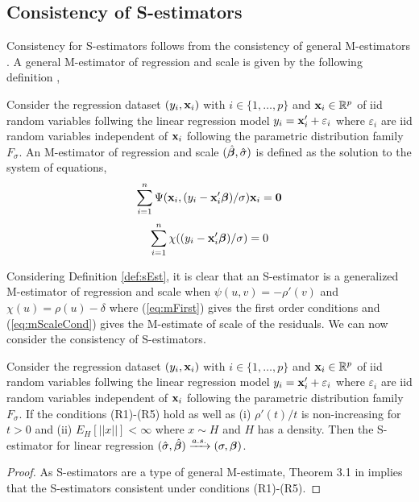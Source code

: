 \subsection{Consistency of S-estimators}

Consistency for S-estimators follows from the consistency of general M-estimators \cite{maronna2019robust}. A general M-estimator of regression and scale is given by the following definition \cite{maronna1981asymptotic},
\begin{defn}
Consider the regression dataset $(y_i, \mathbf{x}_i)$ with $i\in\{1,\hdots,p\}$ and $\mathbf{x}_i \in \mathbb{R}^p$ of iid random variables follwing the linear regression model $y_i = \mathbf{x}_i'+\varepsilon_i$ where $\varepsilon_i$ are iid random variables independent of $\mathbf{x}_i$ following the parametric distribution family $F_\sigma$. An M-estimator of regression and scale $(\hat{\bm{\beta}}, \hat\sigma)$ is defined as the solution to the system of equations,
\begin{equation}
\label{eq:mFirst}
    \sum_{i=1}^n \Psi(\mathbf{x}_i, (y_i-\mathbf{x}_i'\bm{\beta})/\sigma)\mathbf{x}_i = \mathbf{0} 
\end{equation}
\begin{equation}
\label{eq:mScaleCond}
    \sum_{i=1}^n \chi((y_i-\mathbf{x}_i'\bm{\beta})/\sigma) = 0
\end{equation}
\end{defn}
Considering Definition \ref{def:sEst}, it is clear that an S-estimator is a generalized M-estimator of regression and scale when $\psi(u,v) = -\rho'(v)$ and $\chi(u) = \rho(u) - \delta$ where (\ref{eq:mFirst}) gives the first order conditions and (\ref{eq:mScaleCond}) gives the M-estimate of scale of the residuals. We can now consider the consistency of S-estimators.
\begin{thm}
\label{thm:sConsist}
Consider the regression dataset $(y_i, \mathbf{x}_i)$ with $i\in\{1,\hdots,p\}$ and $\mathbf{x}_i \in \mathbb{R}^p$ of iid random variables follwing the linear regression model $y_i = \mathbf{x}_i'+\varepsilon_i$ where $\varepsilon_i$ are iid random variables independent of $\mathbf{x}_i$ following the parametric distribution family $F_\sigma$. If the conditions (R1)-(R5) hold as well as (i) $\rho'(t)/t$ is non-increasing for $t>0$ and (ii) $E_H[||x||] < \infty$ where $x\sim H$ and $H$ has a density. Then the S-estimator for linear regression $(\hat\sigma, \hat{\bm{\beta}}) \xrightarrow{a.s.} (\sigma, \bm{\beta})$.
\end{thm}
\begin{proof}
As S-estimators are a type of general M-estimate, Theorem  3.1 in \cite{maronna1981asymptotic} implies that the S-estimators consistent under conditions (R1)-(R5).
\end{proof}

